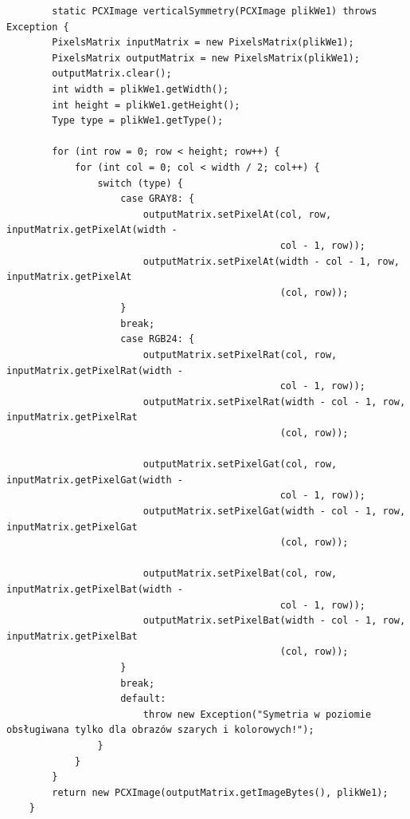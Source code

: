\documentclass{article}
\begin{document}
	\begin{verbatim}
	    static PCXImage verticalSymmetry(PCXImage plikWe1) throws Exception {
        PixelsMatrix inputMatrix = new PixelsMatrix(plikWe1);
        PixelsMatrix outputMatrix = new PixelsMatrix(plikWe1);
        outputMatrix.clear();
        int width = plikWe1.getWidth();
        int height = plikWe1.getHeight();
        Type type = plikWe1.getType();

        for (int row = 0; row < height; row++) {
            for (int col = 0; col < width / 2; col++) {
                switch (type) {
                    case GRAY8: {
                        outputMatrix.setPixelAt(col, row, inputMatrix.getPixelAt(width - 
												col - 1, row));
                        outputMatrix.setPixelAt(width - col - 1, row, inputMatrix.getPixelAt
												(col, row));
                    }
                    break;
                    case RGB24: {
                        outputMatrix.setPixelRat(col, row, inputMatrix.getPixelRat(width -
												col - 1, row));
                        outputMatrix.setPixelRat(width - col - 1, row, inputMatrix.getPixelRat
												(col, row));

                        outputMatrix.setPixelGat(col, row, inputMatrix.getPixelGat(width -
												col - 1, row));
                        outputMatrix.setPixelGat(width - col - 1, row, inputMatrix.getPixelGat
												(col, row));

                        outputMatrix.setPixelBat(col, row, inputMatrix.getPixelBat(width -
												col - 1, row));
                        outputMatrix.setPixelBat(width - col - 1, row, inputMatrix.getPixelBat
												(col, row));
                    }
                    break;
                    default:
                        throw new Exception("Symetria w poziomie obsługiwana tylko dla obrazów szarych i kolorowych!");
                }
            }
        }
        return new PCXImage(outputMatrix.getImageBytes(), plikWe1);
    }
	\end{verbatim}
\end{document}
